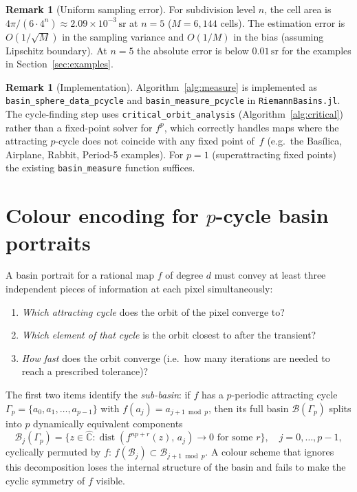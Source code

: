 \documentclass[12pt]{article}
\theoremstyle{definition}
\newtheorem{remark}[theorem]{Remark}
\begin{document}
\begin{remark}[Uniform sampling error]
For subdivision level $n$, the cell area is $4\pi/(6\cdot4^n)\approx
2.09\times10^{-3}\,\mathrm{sr}$ at $n=5$ ($M=6{,}144$ cells).  The
estimation error is $O(1/\sqrt{M})$ in the sampling variance and $O(1/M)$
in the bias (assuming Lipschitz boundary).  At $n=5$ the absolute error
is below $0.01\,\mathrm{sr}$ for the examples in Section~\ref{sec:examples}.
\end{remark}

\begin{remark}[Implementation]
Algorithm~\ref{alg:measure} is implemented as \texttt{basin\_sphere\_data\_pcycle}
and \texttt{basin\_measure\_pcycle} in \texttt{RiemannBasins.jl}.
The cycle-finding step uses \texttt{critical\_orbit\_analysis}
(Algorithm~\ref{alg:critical}) rather than a fixed-point solver for $f^p$,
which correctly handles maps where the attracting $p$-cycle does not coincide
with any fixed point of~$f$ (e.g.\ the Bas\'ilica, Airplane, Rabbit,
Period-5 examples).  For $p=1$ (superattracting fixed points) the existing
\texttt{basin\_measure} function suffices.
\end{remark}

\section{Colour encoding for $p$-cycle basin portraits}
\label{sec:colour}

A basin portrait for a rational map $f$ of degree $d$ must convey at least
three independent pieces of information at each pixel simultaneously:
\begin{enumerate}
  \item \emph{Which attracting cycle} does the orbit of the pixel converge to?
  \item \emph{Which element of that cycle} is the orbit closest to after the
        transient?
  \item \emph{How fast} does the orbit converge (i.e.\ how many iterations are
        needed to reach a prescribed tolerance)?
\end{enumerate}
The first two items identify the \emph{sub-basin}: if $f$ has a $p$-periodic
attracting cycle $\Gamma_p=\{a_0,a_1,\ldots,a_{p-1}\}$ with $f(a_j)=a_{j+1\bmod p}$,
then its full basin $\mathcal{B}(\Gamma_p)$ splits into $p$ dynamically equivalent
components
\[
  \mathcal{B}_j(\Gamma_p)
    = \bigl\{z\in\hat{\mathbb{C}} :
        \operatorname{dist}(f^{np+r}(z),\,a_j)\to 0 \text{ for some } r\bigr\},
  \quad j=0,\ldots,p-1,
\]
cyclically permuted by $f$: $f(\mathcal{B}_j)\subset\mathcal{B}_{j+1\bmod p}$.
A colour scheme that ignores this decomposition loses the internal structure of
the basin and fails to make the cyclic symmetry of $f$ visible.
\end{document}
